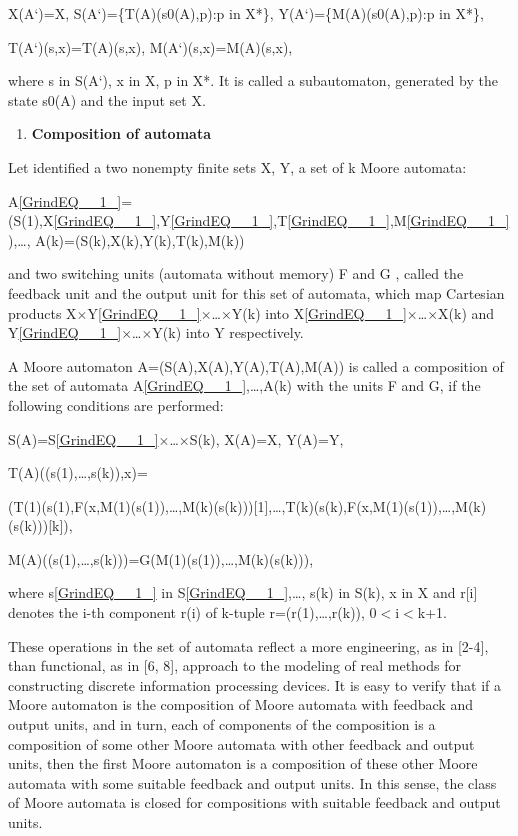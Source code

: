 \documentclass{article}
\begin{document}
X(A`)=X, S(A`)=\{T(A)(s0(A),p):p in X*\}, Y(A`)=\{M(A)(s0(A),p):p in X*\},

T(A`)(s,x)=T(A)(s,x), M(A`)(s,x)=M(A)(s,x),

where s in S(A`), x in X,  p in X*. It is called a subautomaton, generated by the state s0(A) and the input set X.

\begin{enumerate}
\item  \textbf{Composition of automata}
\end{enumerate}

Let identified a two nonempty finite sets X, Y, a set of k Moore automata:

A\eqref{GrindEQ__1_}=(S(1),X\eqref{GrindEQ__1_},Y\eqref{GrindEQ__1_},T\eqref{GrindEQ__1_},M\eqref{GrindEQ__1_}),\dots , A(k)=(S(k),X(k),Y(k),T(k),M(k))

and two switching units (automata without memory) F and G , called the feedback unit and the output unit for this set of automata, which map Cartesian products X$\times$Y\eqref{GrindEQ__1_}$\times$\dots $\times$Y(k) into X\eqref{GrindEQ__1_}$\times$\dots $\times$X(k) and Y\eqref{GrindEQ__1_}$\times$\dots  $\times$Y(k) into Y respectively.

A Moore automaton A=(S(A),X(A),Y(A),T(A),M(A)) is called a composition of the set of automata A\eqref{GrindEQ__1_},\dots ,A(k) with the units F and G, if the following conditions are performed:

S(A)=S\eqref{GrindEQ__1_}$\times$\dots $\times$S(k), X(A)=X, Y(A)=Y,

T(A)((s(1),\dots ,s(k)),x)=

(T(1)(s(1),F(x,M(1)(s(1)),\dots ,M(k)(s(k)))[1],\dots ,T(k)(s(k),F(x,M(1)(s(1)),\dots ,M(k)(s(k)))[k]),

M(A)((s(1),\dots ,s(k)))=G(M(1)(s(1)),\dots ,M(k)(s(k))),

where s\eqref{GrindEQ__1_} in S\eqref{GrindEQ__1_},\dots , s(k) in S(k), x in X and r[i] denotes the i-th component r(i) of k-tuple r=(r(1),\dots ,r(k)), 0$<$i$<$k+1.

These operations in the set of automata reflect a more engineering, as in [2-4], than functional, as in [6, 8], approach to the modeling of real methods for constructing discrete information processing devices. It is easy to verify that if a Moore automaton is the composition of Moore automata with feedback and output units, and in turn, each of components of the composition is a composition of some other Moore automata with other feedback and output units, then the first Moore automaton is a composition of these other Moore automata with some suitable feedback and output units. In this sense, the class of Moore automata is closed for compositions with suitable feedback and output units.
\end{document}
